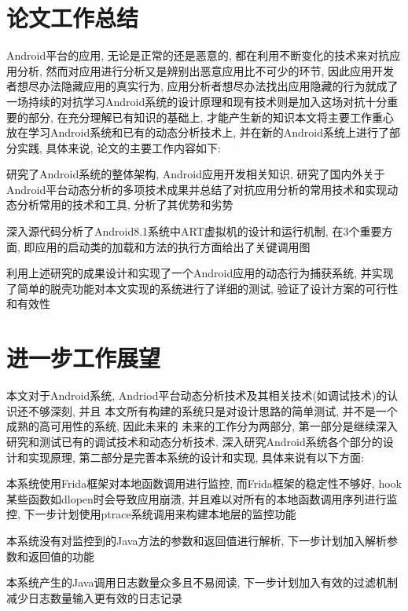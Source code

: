 \section{论文工作总结}
Android平台的应用, 无论是正常的还是恶意的, 都在利用不断变化的技术来对抗应用分析, 然而对应用进行分析又是辨别出恶意应用比不可少的环节, 因此应用开发者想尽办法隐藏应用的真实行为, 应用分析者想尽办法找出应用隐藏的行为就成了一场持续的对抗\juhao 学习Android系统的设计原理和现有技术则是加入这场对抗十分重要的部分, 在充分理解已有知识的基础上, 才能产生新的知识\juhao 本文将主要工作重心放在学习Android系统和已有的动态分析技术上, 并在新的Android系统上进行了部分实践, 具体来说, 论文的主要工作内容如下:

	 研究了Android系统的整体架构, Android应用开发相关知识,  研究了国内外关于Android平台动态分析的多项技术成果并总结了对抗应用分析的常用技术和实现动态分析常用的技术和工具, 分析了其优势和劣势\juhao 
	 
	 深入源代码分析了Android8.1系统中ART虚拟机的设计和运行机制, 在3个重要方面, 即应用的启动\dunhao 类的加载和方法的执行方面给出了关键调用图\juhao 
	 
	 利用上述研究的成果设计和实现了一个Android应用的动态行为捕获系统, 并实现了简单的脱壳功能\juhao 对本文实现的系统进行了详细的测试, 验证了设计方案的可行性和有效性\juhao 
	 
\section{进一步工作展望}
本文对于Android系统, Andriod平台动态分析技术及其相关技术(如调试技术)的认识还不够深刻, 并且
本文所有构建的系统只是对设计思路的简单测试, 并不是一个成熟的高可用性的系统, 因此未来的
未来的工作分为两部分, 第一部分是继续深入研究和测试已有的调试技术和动态分析技术, 深入研究Android系统各个部分的设计和实现原理, 第二部分是完善本系统的设计和实现, 具体来说有以下方面:

本系统使用Frida框架对本地函数调用进行监控, 而Frida框架的稳定性不够好, hook某些函数如dlopen时会导致应用崩溃, 并且难以对所有的本地函数调用序列进行监控, 下一步计划使用ptrace系统调用来构建本地层的监控功能\juhao

本系统没有对监控到的Java方法的参数和返回值进行解析, 下一步计划加入解析参数和返回值的功能\juhao 

本系统产生的Java调用日志数量众多且不易阅读, 下一步计划加入有效的过滤机制减少日志数量输入更有效的日志记录\juhao 
	